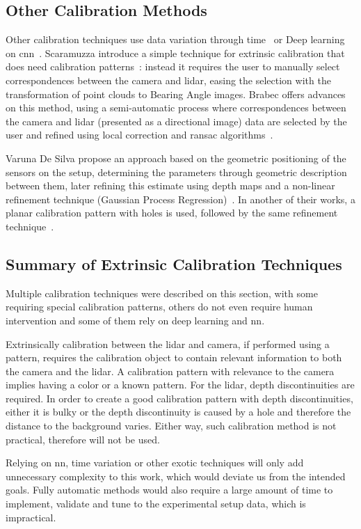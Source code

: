 \subsection{Other Calibration Methods}
Other calibration techniques use data variation through time~\cite{Chien2017} or Deep learning on \ac{cnn}~\cite{Wang2018a}. Scaramuzza \etal introduce a simple technique for extrinsic calibration that does need calibration patterns~\cite{Scaramuzza}: instead it requires the user to manually select correspondences between the camera and \ac{lidar}, easing the selection with the transformation of point clouds to Bearing Angle images. Brabec offers advances on this method, using a semi-automatic process where correspondences between the camera and \ac{lidar} (presented as a directional image) data are selected by the user and refined using local correction and \ac{ransac} algorithms~\cite{brabec2014}.

Varuna De Silva \etal propose an approach based on the geometric positioning of the sensors on the setup, determining the parameters through geometric description between them, later refining this estimate using depth maps and a non-linear refinement technique (Gaussian Process Regression)~\cite{DeSilva2018}. In another of their works, a planar calibration pattern with holes is used, followed by the same refinement technique~\cite{Silva2018}.


\subsection{Summary of Extrinsic Calibration Techniques}
Multiple calibration techniques were described on this section, with some requiring special calibration patterns, others do not even require human intervention and some of them rely on deep learning and \ac{nn}. 

Extrinsically calibration between the \ac{lidar} and camera, if performed using a pattern,  requires the calibration object to contain relevant information to both the camera and the \ac{lidar}. A calibration pattern with relevance to the camera implies having a color or a known pattern. For the \ac{lidar}, depth discontinuities are required. In order to create a good calibration pattern with depth discontinuities, either it is bulky or the depth discontinuity is caused by a hole and therefore the distance to the background varies. Either way, such calibration method is not practical, therefore will not be used.

Relying on \ac{nn}, time variation or other exotic techniques will only add unnecessary complexity to this work, which would deviate us from the intended goals. Fully automatic methods would also require a large amount of time to implement, validate and tune to the experimental setup data, which is impractical.

